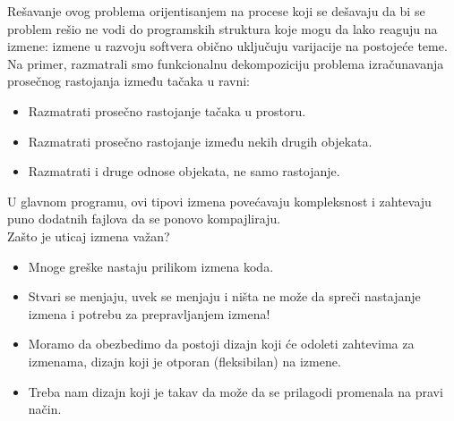 \documentclass[../main.tex]{subfiles}
\begin{document}
Rešavanje ovog problema orijentisanjem na procese koji se dešavaju da bi se problem rešio ne vodi do programskih struktura koje mogu da lako reaguju na izmene: izmene u razvoju softvera obično uključuju varijacije na postojeće teme. Na primer, razmatrali smo funkcionalnu dekompoziciju problema izračunavanja prosečnog rastojanja između tačaka u ravni:
\begin{itemize}
\item Razmatrati prosečno rastojanje tačaka u prostoru.
\item Razmatrati prosečno rastojanje između nekih drugih objekata.
\item Razmatrati i druge odnose objekata, ne samo rastojanje.
\end{itemize}
U glavnom programu, ovi tipovi izmena povećavaju kompleksnost i zahtevaju puno dodatnih fajlova da se ponovo kompajliraju.\\
Zašto je uticaj izmena važan?
\begin{itemize}
\item Mnoge greške nastaju prilikom izmena koda.
\item  Stvari se menjaju, uvek se menjaju i ništa ne može da spreči nastajanje izmena i potrebu za prepravljanjem izmena!
\item Moramo da obezbedimo da postoji dizajn koji će odoleti zahtevima za izmenama, dizajn koji je otporan (fleksibilan) na izmene.
\item Treba nam dizajn koji je takav da može da se prilagodi promenala na pravi način.
\end{itemize}
\end{document}

